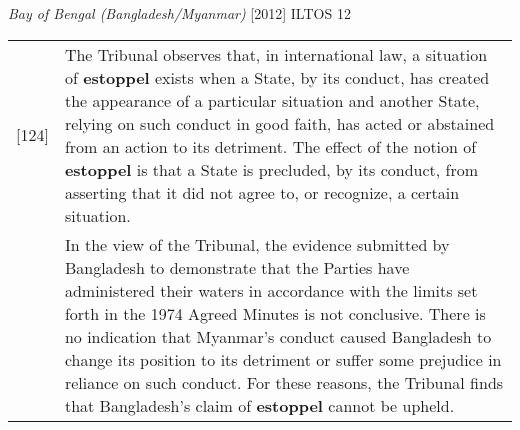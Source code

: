 \begin{casedetails}{\textit{Bay of Bengal (Bangladesh/Myanmar)} [2012] ILTOS 12}
    \begin{longtable}{r|>{\raggedright\arraybackslash}p{}}
        [124] & The Tribunal observes that, in international law, a situation of \textbf{estoppel} exists when a State, by its conduct, has created the appearance of a particular situation and another State, relying on such conduct in good faith, has acted or abstained from an action to its detriment. The effect of the notion of \textbf{estoppel} is that a State is precluded, by its conduct, from asserting that it did not agree to, or recognize, a certain situation. \\[2.5cm]
        [125] & In the view of the Tribunal, the evidence submitted by Bangladesh to demonstrate that the Parties have administered their waters in accordance with the  limits set forth in the 1974 Agreed Minutes is not conclusive. There is no indication that Myanmar's conduct caused Bangladesh to change its position to its  detriment or suffer some prejudice in reliance on such conduct. For these reasons, the Tribunal finds that Bangladesh's claim of \textbf{estoppel} cannot be upheld.
    \end{longtable}    
\end{casedetails}

